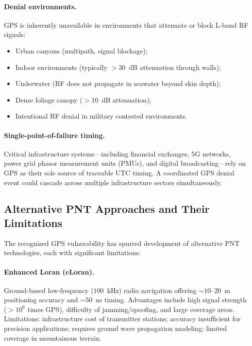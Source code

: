 \documentclass[aps,prd,twocolumn,superscriptaddress,nofootinbib,floatfix]{revtex4-2}
\begin{document}
\paragraph{Denial environments.}
GPS is inherently unavailable in environments that attenuate or block
L-band RF signals:
\begin{itemize}
\item Urban canyons (multipath, signal blockage);
\item Indoor environments (typically $>30$~dB attenuation through walls);
\item Underwater (RF does not propagate in seawater beyond skin depth);
\item Dense foliage canopy ($>10$~dB attenuation);
\item Intentional RF denial in military contested environments.
\end{itemize}

\paragraph{Single-point-of-failure timing.}
Critical infrastructure systems---including financial exchanges, 5G
networks, power grid phasor measurement units (PMUs), and digital
broadcasting---rely on GPS as their sole source of traceable UTC timing.
A coordinated GPS denial event could cascade across multiple
infrastructure sectors simultaneously.

\subsection{Alternative PNT Approaches and Their Limitations}

The recognized GPS vulnerability has spurred development of alternative
PNT technologies, each with significant limitations:

\paragraph{Enhanced Loran (eLoran).}
Ground-based low-frequency ($100$~kHz) radio navigation offering
$\sim 10$--$20$~m positioning accuracy and $\sim 50$~ns timing. Advantages
include high signal strength ($>10^6$ times GPS), difficulty of
jamming/spoofing, and large coverage areas. Limitations: infrastructure
cost of transmitter stations; accuracy insufficient for precision
applications; requires ground wave propagation modeling; limited coverage
in mountainous terrain.
\end{document}

